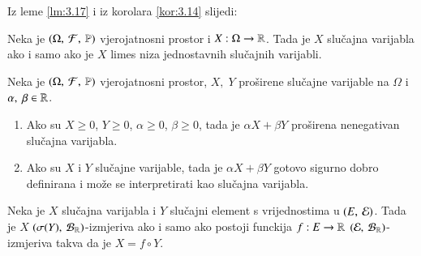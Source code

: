 Iz leme \ref{lm:3.17} i iz korolara \ref{kor:3.14} slijedi:

\begin{tm}  \label{tm:3.18}
    Neka je $(\Omega, \: \mathcal{F}, \: \mathbb{P})$ vjerojatnosni prostor i $X: \Omega \to \mathbb{R}$. Tada je $X$ slu\v cajna varijabla ako i samo ako je $X$ limes niza jednostavnih slu\v cajnih varijabli.
\end{tm}

\begin{zad} \label{zad:3.19}
    Neka je $(\Omega, \: \mathcal{F}, \: \mathbb{P})$ vjerojatnosni prostor, $X, \; Y$ pro\v sirene slu\v cajne varijable na $\Omega$ i $\alpha, \; \beta \in \mathbb{R}$.
    \begin{enumerate}[label=(\alph*)]
        \item Ako su $X \geq 0$, $Y \geq 0$, $\alpha \geq 0$, $\beta    \geq 0$, tada je $\alpha X + \beta Y$ pro\v sirena nenegativan slu\v cajna varijabla.
        \item Ako su $X$ i $Y$ slu\v cajne  varijable, tada je $\alpha X + \beta Y$ gotovo sigurno dobro definirana i mo\v ze se interpretirati kao slu\v cajna varijabla.
    \end{enumerate}
\end{zad}

\begin{zad}
    Neka je $X$ slu\v cajna varijabla i $Y$ slu\v cajni element s vrijednostima u $(E, \: \mathcal{E})$.
    Tada je $X$ $(\sigma({Y}), \: \mathcal{B}_{\mathbb{R}})$-izmjeriva ako i samo ako postoji funckija $f: E \to \mathbb{R}$ $(\mathcal{E}, \: \mathcal{B}_{\mathbb{R}})$-izmjeriva takva da je $X = f \circ Y$.
\end{zad}

%
%